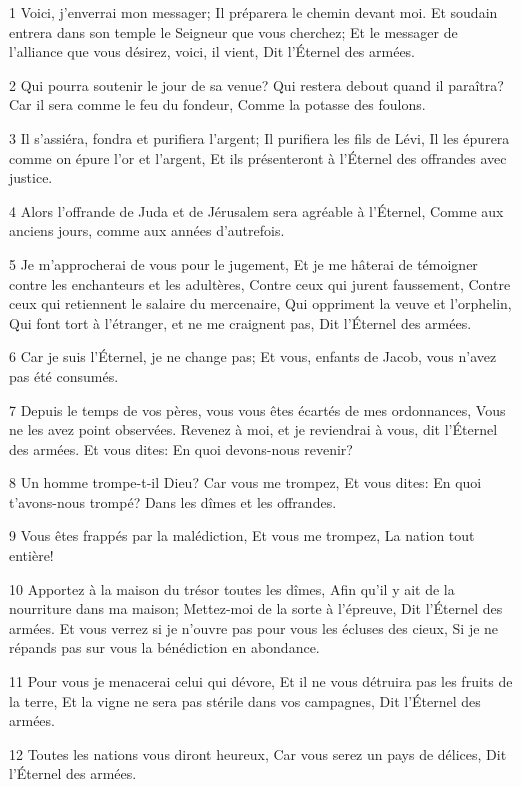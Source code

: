 \par 1 Voici, j'enverrai mon messager; Il préparera le chemin devant moi. Et soudain entrera dans son temple le Seigneur que vous cherchez; Et le messager de l'alliance que vous désirez, voici, il vient, Dit l'Éternel des armées.
\par 2 Qui pourra soutenir le jour de sa venue? Qui restera debout quand il paraîtra? Car il sera comme le feu du fondeur, Comme la potasse des foulons.
\par 3 Il s'assiéra, fondra et purifiera l'argent; Il purifiera les fils de Lévi, Il les épurera comme on épure l'or et l'argent, Et ils présenteront à l'Éternel des offrandes avec justice.
\par 4 Alors l'offrande de Juda et de Jérusalem sera agréable à l'Éternel, Comme aux anciens jours, comme aux années d'autrefois.
\par 5 Je m'approcherai de vous pour le jugement, Et je me hâterai de témoigner contre les enchanteurs et les adultères, Contre ceux qui jurent faussement, Contre ceux qui retiennent le salaire du mercenaire, Qui oppriment la veuve et l'orphelin, Qui font tort à l'étranger, et ne me craignent pas, Dit l'Éternel des armées.
\par 6 Car je suis l'Éternel, je ne change pas; Et vous, enfants de Jacob, vous n'avez pas été consumés.
\par 7 Depuis le temps de vos pères, vous vous êtes écartés de mes ordonnances, Vous ne les avez point observées. Revenez à moi, et je reviendrai à vous, dit l'Éternel des armées. Et vous dites: En quoi devons-nous revenir?
\par 8 Un homme trompe-t-il Dieu? Car vous me trompez, Et vous dites: En quoi t'avons-nous trompé? Dans les dîmes et les offrandes.
\par 9 Vous êtes frappés par la malédiction, Et vous me trompez, La nation tout entière!
\par 10 Apportez à la maison du trésor toutes les dîmes, Afin qu'il y ait de la nourriture dans ma maison; Mettez-moi de la sorte à l'épreuve, Dit l'Éternel des armées. Et vous verrez si je n'ouvre pas pour vous les écluses des cieux, Si je ne répands pas sur vous la bénédiction en abondance.
\par 11 Pour vous je menacerai celui qui dévore, Et il ne vous détruira pas les fruits de la terre, Et la vigne ne sera pas stérile dans vos campagnes, Dit l'Éternel des armées.
\par 12 Toutes les nations vous diront heureux, Car vous serez un pays de délices, Dit l'Éternel des armées.
